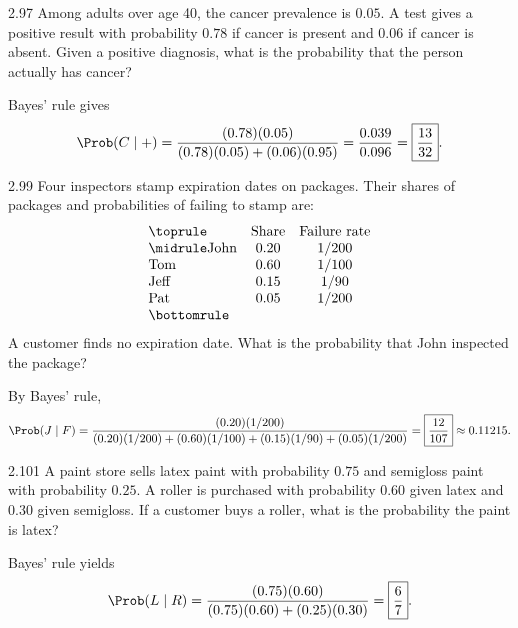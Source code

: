 \documentclass[11pt,oneside]{article}
\begin{document}
\begin{exercise}{2.97}
Among adults over age 40, the cancer prevalence is $0.05$. A test gives a positive result with probability $0.78$ if cancer is present and $0.06$ if cancer is absent. Given a positive diagnosis, what is the probability that the person actually has cancer?
\end{exercise}

\begin{solution}
Bayes' rule gives
\[
\Prob(C\mid+)=\frac{(0.78)(0.05)}{(0.78)(0.05)+(0.06)(0.95)}
=\frac{0.039}{0.096}=\boxed{\frac{13}{32}}.
\]
\end{solution}

\begin{exercise}{2.99}
Four inspectors stamp expiration dates on packages. Their shares of packages and probabilities of failing to stamp are:
\[
\begin{array}{lcc}\toprule
&\text{Share}&\text{Failure rate}\\\midrule
\text{John}&0.20&1/200\\
\text{Tom}&0.60&1/100\\
\text{Jeff}&0.15&1/90\\
\text{Pat}&0.05&1/200\\\bottomrule
\end{array}
\]
A customer finds no expiration date. What is the probability that John inspected the package?
\end{exercise}

\begin{solution}
By Bayes' rule,
\[
\Prob(J\mid F)=
\frac{(0.20)(1/200)}{(0.20)(1/200)+(0.60)(1/100)+(0.15)(1/90)+(0.05)(1/200)}
=\boxed{\frac{12}{107}}\approx0.11215.
\]
\end{solution}

\begin{exercise}{2.101}
A paint store sells latex paint with probability $0.75$ and semigloss paint with probability $0.25$. A roller is purchased with probability $0.60$ given latex and $0.30$ given semigloss. If a customer buys a roller, what is the probability the paint is latex?
\end{exercise}

\begin{solution}
Bayes' rule yields
\[
\Prob(L\mid R)=\frac{(0.75)(0.60)}{(0.75)(0.60)+(0.25)(0.30)}
=\boxed{\frac67}.
\]
\end{solution}
\end{document}
